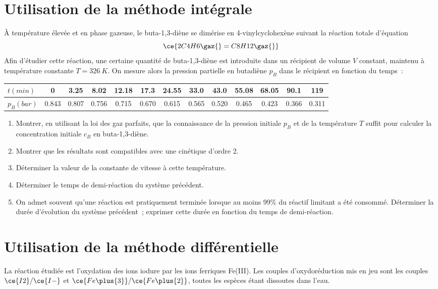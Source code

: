 \documentclass[a4paper, 12pt, final, garamond]{book}
\begin{document}
\section{Utilisation de la méthode intégrale}
À température élevée et en phase gazeuse, le buta-1,3-diène se dimérise en
4-vinylcyclohexène suivant la réaction totale d'équation
\[\ce{2C4H6\gaz{} = C8H12\gaz{}}\]
Afin d'étudier cette réaction, une certaine quantité de buta-1,3-diène est
introduite dans un récipient de volume $V$ constant, maintenu à température
constante $T = \SI{326}{K}$. On mesure alors la pression partielle en butadiène
$p_B$ dans le récipient en fonction du temps~:
\begin{center}
    \begin{tabular}{lcccccccccccc}
        \toprule 
        $t(\si{min})$ &
        0 & \num{3.25} & \num{8.02} & \num{12.18} & \num{17.3} & \num{24.55} &
        \num{33.0} & \num{43.0} & \num{55.08} & \num{68.05} & \num{90.1} &
        \num{119}\\
        \midrule
        $p_B(\si{bar})$ &
        \num{0.843} & \num{0.807} & \num{0.756} & \num{0.715} & \num{0.670} &
        \num{0.615} & \num{0.565} & \num{0.520} & \num{0.465} & \num{0.423} &
        \num{0.366} & \num{0.311}\\
        \bottomrule
    \end{tabular}
\end{center}
\begin{enumerate}
    \item Montrer, en utilisant la loi des gaz parfaits, que la connaissance de
        la pression initiale $p_B$ et de la température $T$ suffit pour calculer
        la concentration initiale $c_B$ en buta-1,3-diène.
    \item Montrer que les résultats sont compatibles avec une cinétique d'ordre
        2.
    \item Déterminer la valeur de la constante de vitesse à cette température.
    \item Déterminer le temps de demi-réaction du système précédent.
    \item On admet souvent qu'une réaction est pratiquement terminée lorsque au
        moins 99\% du réactif limitant a été consommé. Déterminer la durée
        d'évolution du système précédent~; exprimer cette durée en fonction du
        temps de demi-réaction.
\end{enumerate}

\section{Utilisation de la méthode différentielle}
La réaction étudiée est l'oxydation des ions iodure par les ions ferriques
Fe(III). Les couples d'oxydoréduction mis en jeu sont les couples
$\ce{I2}/\ce{I-}$ et $\ce{Fe\plus{3}}/\ce{Fe\plus{2}}$, toutes les espèces étant
dissoutes dans l'eau.
\end{document}
